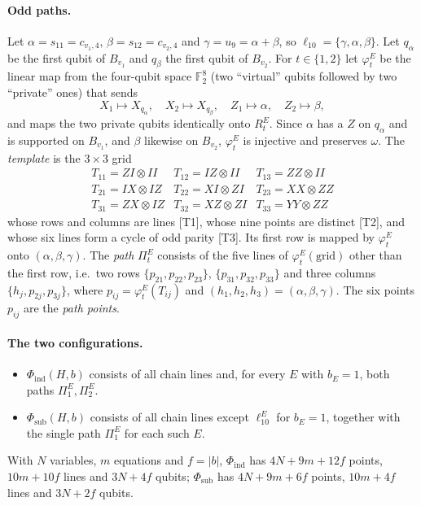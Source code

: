 \documentclass[a4paper,onecolumn,11pt,unpublished,nopdfoutputerror]{quantumarticle}
\theoremstyle{definition}
\newcommand{\cert}[1]{\textcolor{certblue}{\textsf{[#1]}}}
\newcommand{\F}{\mathbb{F}_2}
\begin{document}
\paragraph{Odd paths.} Let $\alpha=s_{11}=c_{v_1,4}$, $\beta=s_{12}=c_{v_2,4}$ and $\gamma=u_9=\alpha+\beta$, so
$\ell_{10}=\{\gamma,\alpha,\beta\}$. Let $q_\alpha$ be the first qubit of $B_{v_1}$ and $q_\beta$ the first qubit
of $B_{v_2}$. For $t\in\{1,2\}$ let $\varphi^E_t$ be the linear map from the four-qubit space
$\F^{8}$ (two ``virtual'' qubits followed by two ``private'' ones) that sends
\[
X_1\mapsto X_{q_\alpha},\quad X_2\mapsto X_{q_\beta},\quad Z_1\mapsto \alpha,\quad Z_2\mapsto\beta,
\]
and maps the two private qubits identically onto $R^E_t$. Since $\alpha$ has a $Z$ on $q_\alpha$ and is supported
on $B_{v_1}$, and $\beta$ likewise on $B_{v_2}$, $\varphi^E_t$ is injective and preserves $\omega$. The
\emph{template} is the $3\times3$ grid
\[
\begin{array}{ccc}
T_{11}=ZI\otimes II & T_{12}=IZ\otimes II & T_{13}=ZZ\otimes II\\
T_{21}=IX\otimes IZ & T_{22}=XI\otimes ZI & T_{23}=XX\otimes ZZ\\
T_{31}=ZX\otimes IZ & T_{32}=XZ\otimes ZI & T_{33}=YY\otimes ZZ
\end{array}
\]
whose rows and columns are lines \cert{T1}, whose nine points are distinct \cert{T2}, and whose six lines form a
cycle of odd parity \cert{T3}. Its first row is mapped by $\varphi^E_t$ onto $(\alpha,\beta,\gamma)$. The
\emph{path} $\Pi^E_t$ consists of the five lines of $\varphi^E_t(\text{grid})$ other than the first row, i.e.\ two
rows $\{p_{21},p_{22},p_{23}\}$, $\{p_{31},p_{32},p_{33}\}$ and three columns $\{h_j,p_{2j},p_{3j}\}$, where
$p_{ij}=\varphi^E_t(T_{ij})$ and $(h_1,h_2,h_3)=(\alpha,\beta,\gamma)$. The six points $p_{ij}$ are the
\emph{path points}.

\paragraph{The two configurations.}
\begin{itemize}[leftmargin=*]
\item $\Phi_{\mathrm{ind}}(H,b)$ consists of all chain lines and, for every $E$ with $b_E=1$, both paths
$\Pi^E_1,\Pi^E_2$.
\item $\Phi_{\mathrm{sub}}(H,b)$ consists of all chain lines except $\ell^E_{10}$ for $b_E=1$, together with the
single path $\Pi^E_1$ for each such $E$.
\end{itemize}
With $N$ variables, $m$ equations and $f=|b|$, $\Phi_{\mathrm{ind}}$ has $4N+9m+12f$ points, $10m+10f$ lines and
$3N+4f$ qubits; $\Phi_{\mathrm{sub}}$ has $4N+9m+6f$ points, $10m+4f$ lines and $3N+2f$ qubits.
\end{document}
